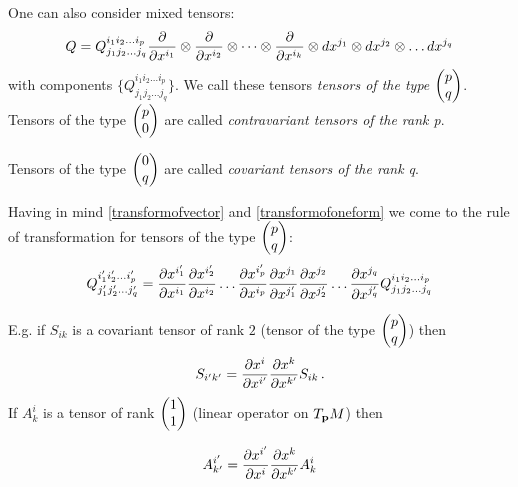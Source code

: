\documentclass[12pt]{article}
\theoremstyle{theorem}
\numberwithin{equation}{section}
\begin{document}
One can also consider mixed tensors:
          $$
        Q=Q^{i_1i_2\dots i_p}_{j_1j_2\dots j_q}{\partial\over \partial x^{i_1}}\otimes
             {\partial\over \partial x^{i_2}}\otimes \dots \otimes {\partial\over \partial x^{i_k}}\otimes
             dx^{j_1}\otimes
              dx^{j_2}\otimes \dots dx^{j_q}
          $$
with components $\{Q^{i_1i_2\dots i_p}_{j_1j_2\dots j_q}\}$. We call these tensors
{\it tensors of the type  $\begin{pmatrix} p\cr q\cr\end{pmatrix}$}.
Tensors of the type $\begin{pmatrix} p\cr 0\cr\end{pmatrix}$ are called
{\it contravariant tensors of the rank p}.

Tensors of the type $\begin{pmatrix} 0\cr q\cr\end{pmatrix}$ are called
{\it covariant tensors of the rank q}.


Having in mind \eqref{transformofvector} and \eqref{transformofoneform} we come  to
the rule of transformation for tensors of the type  $\begin{pmatrix} p\cr q\cr\end{pmatrix}$:
\begin{equation}\label{ruleoftransformationofarbitrarytensors}
    Q^{i'_1i'_2\dots i'_p}_{j'_1j'_2\dots j'_q}=
    {\partial x^{i'_1}\over \partial x^{i_1}}
    {\partial x^{i'_2}\over \partial x^{i_2}}
    \dots
    {\partial x^{i'_p}\over \partial x^{i_p}}
    {\partial x^{j_1}\over \partial x^{j'_1}}
    {\partial x^{j_2}\over \partial x^{j'_2}}
    \dots
    {\partial x^{j_q}\over \partial x^{j'_q}}
    Q^{i_1i_2\dots i_p}_{j_1j_2\dots j_q}
\end{equation}



E.g. if $S_{ik}$ is a covariant tensor
of rank $2$  (tensor of the type $\begin{pmatrix} p\cr q\cr\end{pmatrix}$) then
            \begin{equation}\label{ruleoftransformfor 2-tensor}
                S_{i'k'}={\partial x^i\over \partial x^{i'}}{\partial x^k\over \partial x^{k'}}S_{ik}\,.
            \end{equation}
 If $A^i_k$ is a tensor of rank $\begin{pmatrix} 1\cr 1\cr\end{pmatrix}$ (linear operator on $T_{\bf p} M$)
 then

             $$
    A^{i'}_{k'}=        {\partial x^{i'}\over \partial x^{i}}{\partial x^k\over \partial x^{k'}}A^i_k
             $$
\end{document}
